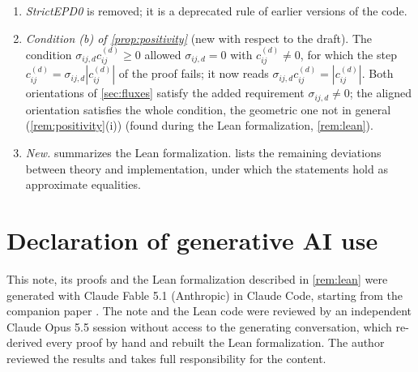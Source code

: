 \documentclass[11pt,a4paper]{article}
\theoremstyle{plain}
\theoremstyle{definition}
\theoremstyle{remark}
\numberwithin{equation}{section}
\begin{document}
\begin{enumerate}
\item \emph{StrictEPD0} is removed; it is a deprecated rule of earlier versions of the code.
\item \emph{Condition (b) of \cref{prop:positivity}} (new with respect to the draft). The condition $\sigma_{ij,d}c^{(d)}_{ij}\ge0$ allowed $\sigma_{ij,d}=0$ with $c^{(d)}_{ij}\ne0$, for which the step $c^{(d)}_{ij}=\sigma_{ij,d}|c^{(d)}_{ij}|$ of the proof fails; it now reads $\sigma_{ij,d}c^{(d)}_{ij}=|c^{(d)}_{ij}|$. Both orientations of \cref{sec:fluxes} satisfy the added requirement $\sigma_{ij,d}\ne0$; the aligned orientation satisfies the whole condition, the geometric one not in general (\cref{rem:positivity}(i)) (found during the Lean formalization, \cref{rem:lean}).
\item \emph{New.}  summarizes the Lean formalization.  lists the remaining deviations between theory and implementation, under which the statements hold as approximate equalities.
\end{enumerate}

\section*{Declaration of generative AI use}
This note, its proofs and the Lean formalization described in \cref{rem:lean} were generated with Claude Fable 5.1 (Anthropic) in Claude Code, starting from the companion paper \cite{JungMUSCL2026}. The note and the Lean code were reviewed by an independent Claude Opus 5.5 session without access to the generating conversation, which re-derived every proof by hand and rebuilt the Lean formalization. The author reviewed the results and takes full responsibility for the content.



\end{document}
